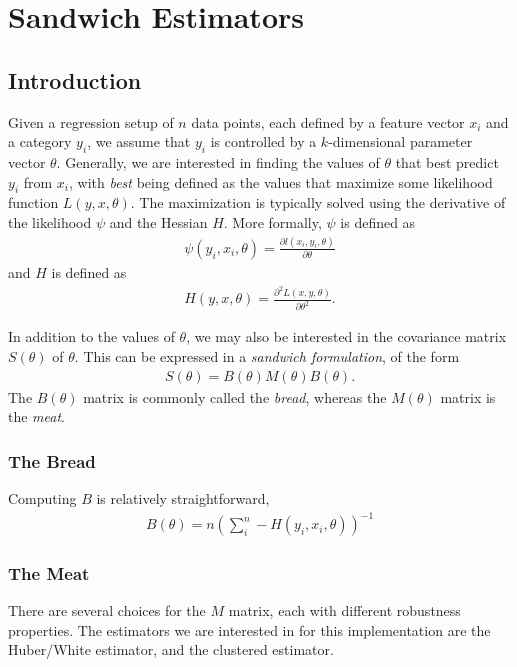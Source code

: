 
\chapter[Sandwich Estimators]{Sandwich Estimators}


\section{Introduction}
Given a regression setup of $n$ data points, each defined by a feature  vector $x_i$ and a category $y_i$, we assume that $y_i$ is controlled by a $k$-dimensional parameter vector $\theta$.  Generally, we are interested in finding the values of $\theta$ that best predict $y_i$ from $x_i$, with \textit{best} being defined as the values that maximize some likelihood function $L(y,x,\theta)$.  The maximization is typically solved using the derivative of the likelihood $\psi$  and the Hessian $H$.  More formally, $\psi$ is defined as 
\begin{align}
  \psi(y_i,x_i, \theta) = \frac{\partial l(x_i,y_i,\theta)}{\partial \theta}
\end{align} 
and $H$ is defined as
\begin{align}
H(y,x, \theta) = \frac{\partial^2 L(x,y,\theta)}{\partial \theta^2}.
\end{align} 



In addition to the values of $\theta$, we may also be interested in the covariance matrix $S(\theta)$ of $\theta$.  This can be expressed in a \textit{sandwich formulation}, of the form
\begin{align}
S(\theta) = B(\theta) M(\theta) B(\theta).  
\end{align}
The $B(\theta)$ matrix is commonly called the \textit{bread}, whereas the $M(\theta)$ matrix is the \textit{meat}.  

\subsection{The Bread}
Computing $B$ is relatively straightforward, 
\begin{align}
B(\theta) = n\left(\sum_i^n -H(y_i, x_i, \theta) \right)^{-1}
\end{align}

\subsection{The Meat}
There are several choices for the $M$ matrix, each with different robustness properties.  The estimators we are interested in for this implementation are the Huber/White estimator, and the clustered estimator.  


